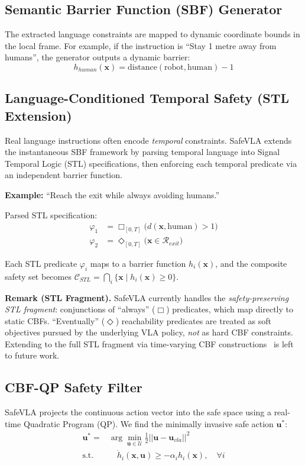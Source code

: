 \documentclass[conference]{IEEEtran}
\begin{document}
\subsection{Semantic Barrier Function (SBF) Generator}
The extracted language constraints are mapped to dynamic coordinate bounds in the local frame. For example, if the instruction is ``Stay 1 metre away from humans'', the generator outputs a dynamic barrier:
\begin{equation}
h_{human}(\mathbf{x}) = \text{distance}(\text{robot}, \text{human}) - 1
\end{equation}

\subsection{Language-Conditioned Temporal Safety (STL Extension)}
Real language instructions often encode \textit{temporal} constraints. SafeVLA extends the instantaneous SBF framework by parsing temporal language into Signal Temporal Logic (STL) specifications, then enforcing each temporal predicate via an independent barrier function.

\noindent\textbf{Example:} ``Reach the exit while always avoiding humans.''

\noindent Parsed STL specification:
\begin{align}
\varphi_1 &= \Box_{[0,T]} \big( d(\mathbf{x}, \text{human}) > 1 \big) \label{eq:stl_always} \\
\varphi_2 &= \Diamond_{[0,T]} \big( \mathbf{x} \in \mathcal{R}_{exit} \big) \label{eq:stl_eventually}
\end{align}

Each STL predicate $\varphi_i$ maps to a barrier function $h_i(\mathbf{x})$, and the composite safety set becomes $\mathcal{C}_{STL} = \bigcap_i \{ \mathbf{x} \mid h_i(\mathbf{x}) \ge 0 \}$.

\noindent\textbf{Remark (STL Fragment).} SafeVLA currently handles the \textit{safety-preserving STL fragment}: conjunctions of ``always'' ($\Box$) predicates, which map directly to static CBFs. ``Eventually'' ($\Diamond$) reachability predicates are treated as soft objectives pursued by the underlying VLA policy, \textit{not} as hard CBF constraints. Extending to the full STL fragment via time-varying CBF constructions~\cite{lindemann2019cbf_stl_csl, liang2023erg_cbf_stl, chen2025stl_cbf_tac} is left to future work.

\subsection{CBF-QP Safety Filter}
SafeVLA projects the continuous action vector into the safe space using a real-time Quadratic Program (QP). We find the minimally invasive safe action $\mathbf{u}^*$:
\begin{align}
    \mathbf{u}^* =& \arg \min_{\mathbf{u} \in \mathcal{U}} \frac{1}{2} || \mathbf{u} - \mathbf{u}_{vla} ||^2 \label{eq:qp} \\
    \text{s.t.}& \quad \dot{h}_i(\mathbf{x}, \mathbf{u}) \ge -\alpha_i h_i(\mathbf{x}), \quad \forall i
\end{align}
\end{document}
